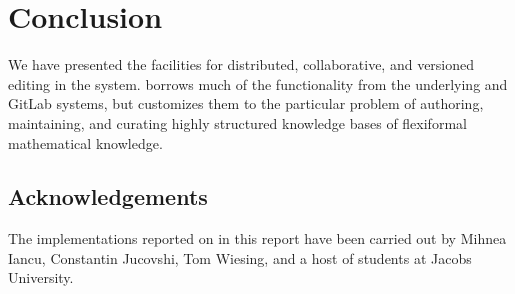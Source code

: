 \section{Conclusion}\label{sec:concl}

We have presented the facilities for distributed, collaborative, and versioned editing in
the \sys system. \sys borrows much of the functionality from the
underlying \git and GitLab systems, but customizes them to the particular 
problem of authoring, maintaining, and curating highly structured knowledge 
bases of flexiformal mathematical knowledge. 

\subsection*{Acknowledgements}

The implementations reported on in this report have been carried out by Mihnea Iancu,
Constantin Jucovshi, Tom Wiesing, and a host of students at Jacobs University.




